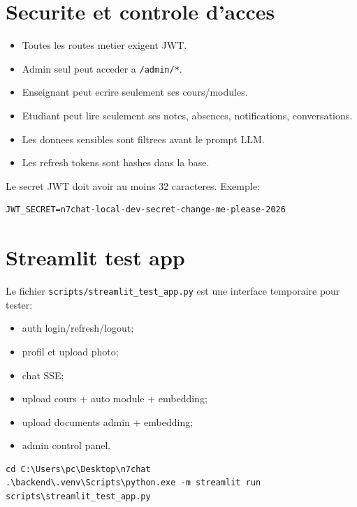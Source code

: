 \documentclass[11pt,a4paper]{article}
\begin{document}
\section{Securite et controle d'acces}

\begin{itemize}[leftmargin=1.2cm]
  \item Toutes les routes metier exigent JWT.
  \item Admin seul peut acceder a \texttt{/admin/*}.
  \item Enseignant peut ecrire seulement ses cours/modules.
  \item Etudiant peut lire seulement ses notes, absences, notifications, conversations.
  \item Les donnees sensibles sont filtrees avant le prompt LLM.
  \item Les refresh tokens sont hashes dans la base.
\end{itemize}

\begin{tcolorbox}[colback=n7red!5,colframe=n7red,title=Point important]
Le secret JWT doit avoir au moins 32 caracteres. Exemple:
\begin{lstlisting}
JWT_SECRET=n7chat-local-dev-secret-change-me-please-2026
\end{lstlisting}
\end{tcolorbox}

\section{Streamlit test app}

Le fichier \texttt{scripts/streamlit\_test\_app.py} est une interface temporaire pour tester:

\begin{itemize}[leftmargin=1.2cm]
  \item auth login/refresh/logout;
  \item profil et upload photo;
  \item chat SSE;
  \item upload cours + auto module + embedding;
  \item upload documents admin + embedding;
  \item admin control panel.
\end{itemize}

\begin{lstlisting}
cd C:\Users\pc\Desktop\n7chat
.\backend\.venv\Scripts\python.exe -m streamlit run scripts\streamlit_test_app.py
\end{lstlisting}
\end{document}
